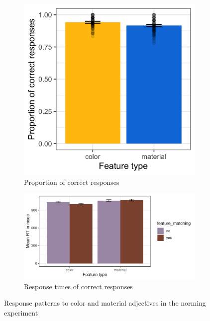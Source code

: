 \documentclass[12pt,letterpaper]{article}
\begin{document}
\begin{figure}[ht]
\centering
\begin{subfigure}{.4\textwidth}
\centering
\includegraphics[width=\textwidth]{plots/exp1_proportion.png}
\caption{Proportion of correct responses}
\label{fig:exp1_a}
\end{subfigure} \hspace{9mm}
\begin{subfigure}{.4 \textwidth}
\centering
\includegraphics[width=\textwidth]{plots/exp1_rt.png}
\caption{Response times of correct responses}
\label{fig:exp1_b}
\end{subfigure}
\caption{Response patterns to color and material adjectives in the norming experiment}
\label{fig:exp1}
\end{figure}   
\end{document}
